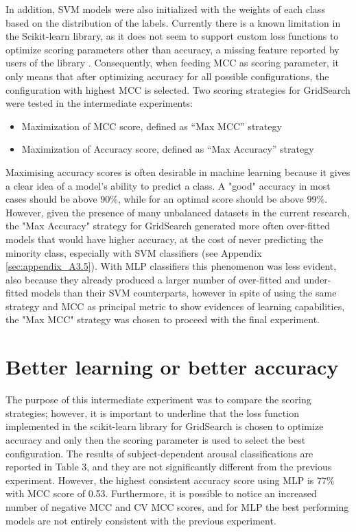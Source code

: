 In addition, \ac{SVM} models were also initialized with the weights of each class based on the distribution of the labels. Currently there is a known limitation in the Scikit-learn library, as it does not seem to support custom loss functions to optimize scoring parameters other than accuracy, a missing feature reported by users of the library \cite{martin_stacked_nodate, noauthor_please_nodate}. Consequently, when feeding \ac{MCC} as scoring parameter, it only means that after optimizing accuracy for all possible configurations, the configuration with highest \ac{MCC} is selected. Two scoring strategies for GridSearch were tested in the intermediate experiments:
\begin{itemize}
\item 	Maximization of \ac{MCC} score, defined as “Max MCC” strategy
\item 	Maximization of Accuracy score, defined as “Max Accuracy” strategy
\end{itemize}
Maximising accuracy scores is often desirable in machine learning because it gives a clear idea of a model's ability to predict a class. A "good" accuracy in most cases should be above 90\%, while for an optimal score should be above 99\%. However, given the presence of many unbalanced datasets in the current research, the "Max Accuracy" strategy for GridSearch generated more often over-fitted models that would have higher accuracy, at the cost of never predicting the minority class, especially with \ac{SVM} classifiers (see Appendix \ref{sec:appendix_A3.5}). With \ac{MLP} classifiers this phenomenon was less evident, also because they already produced a larger number of over-fitted and under-fitted models than their \ac{SVM} counterparts, however in spite of using the same strategy and \ac{MCC} as principal metric to show evidences of learning capabilities, the "Max MCC" strategy was chosen to proceed with the final experiment.

\iffalse
\section{Better learning or better accuracy}
\label{sec:better_learning_accuracy}
The purpose of this intermediate experiment was to compare the scoring strategies; however, it is important to underline that the loss function implemented in the scikit-learn library for GridSearch is chosen to optimize accuracy and only then the scoring parameter is used to select the best configuration. The results of subject-dependent arousal classifications are reported in Table 3, and they are not significantly different from the previous experiment. However, the highest consistent accuracy score using \ac{MLP} is 77\% with \ac{MCC} score of 0.53. Furthermore, it is possible to notice an increased number of negative \ac{MCC} and \ac{CV MCC} scores, and for \ac{MLP} the best performing models are not entirely consistent with the previous experiment.

